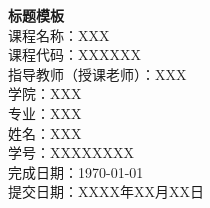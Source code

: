 \documentclass[12pt]{ctexart}
\begin{document}

\newpage                %

\newpage                %

\newpage                %


\begin{titlepage} %
    \centering    %
    \vspace*{\fill} %
    {\bfseries\Huge 标题模板 \\[1cm]}   %
    {\Large 课程名称：XXX \\[0.5cm]} %
    {\Large 课程代码：XXXXXX \\[0.5cm]} %
    {\Large 指导教师（授课老师）：XXX \\[0.5cm]} %
    {\Large 学院：XXX \\[0.5cm]} %
    {\Large 专业：XXX \\[0.5cm]} %
    {\Large 姓名：XXX \\[0.5cm]} %
    {\Large 学号：XXXXXXXX \\[0.5cm]} %
    {\Large 完成日期：\today \\[0.5cm]} %
    {\Large 提交日期：XXXX年XX月XX日 \\[0.5cm]} %
    \vspace*{\fill} %
\end{titlepage}
\end{document}
